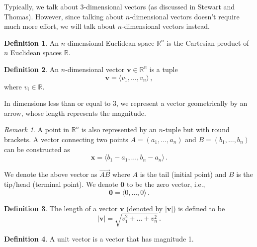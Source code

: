 \documentclass[
]{book}
\theoremstyle{definition}
\newtheorem{definition}{Definition}[chapter]
\theoremstyle{definition}
\theoremstyle{definition}
\theoremstyle{definition}
\theoremstyle{remark}
\newtheorem*{remark}{Remark}
\begin{document}
Typically, we talk about 3-dimensional vectors (as discussed in Stewart and Thomas).
However, since talking about \(n\)-dimensional vectors doesn't
require much more effort,
we will talk about \(n\)-dimensional vectors instead.

\begin{definition}
An \(n\)-dimensional Euclidean space \(\mathbb{R}^n\)
is the Cartesian product of \(n\) Euclidean spaces \(\mathbb{R}\).
\end{definition}

\begin{definition}
An \(n\)-dimensional vector \(\textbf{v}\in \mathbb{R}^n\) is a tuple
\begin{equation}
    \textbf{v} = \langle v_1,\dots, v_n \rangle \,,
\end{equation}
where \(v_i \in \mathbb{R}\).
\end{definition}

In dimensions less than or equal to 3, we represent a vector
geometrically by an arrow, whose length represents the magnitude.

\begin{remark}
A point in \(\mathbb{R}^n\) is also represented by an \(n\)-tuple
but with round brackets.
A vector connecting two points \(A= (a_1, \dots, a_n)\)
and \(B=(b_1, \dots, b_n)\) can be constructed as
\begin{equation*}
    \textbf{x} =  \langle b_1-a_1, \dots, b_n - a_n \rangle \,.
\end{equation*}

We denote the above vector as \(\vec{AB}\) where \(A\) is the tail (initial point)
and \(B\) is the tip/head (terminal point).
We denote \(\textbf{0}\) to be the zero vector, i.e.,
\begin{equation*}
    \textbf{0} = \langle 0, \dots, 0 \rangle \,.
\end{equation*}
\end{remark}

\begin{definition}
The length of a vector \(\textbf{v}\) (denoted by \(| \textbf{v}|\)) is defined to be
\begin{equation}
    |\textbf{v}| = \sqrt{ v_1^2 + \dots + v_n^2} \,.
\end{equation}
\end{definition}

\begin{definition}
A unit vector is a vector that has magnitude 1.
\end{definition}
\end{document}
